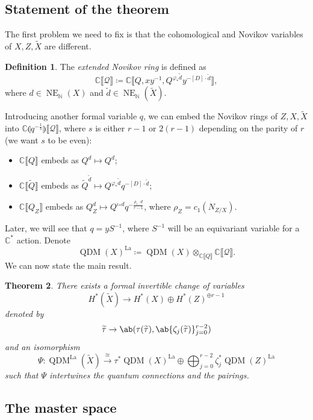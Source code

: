 \documentclass[leqno, openany]{memoir}
\newtheorem{thm}{Theorem}[section]
\theoremstyle{definition}
\newtheorem{defn}[thm]{Definition}
\theoremstyle{remark}
\theoremstyle{plain}
\theoremstyle{definition}
\theoremstyle{remark}
\newcommand{\N}{\mathbb{N}}
\newcommand{\C}{\mathbb{C}}
\newcommand{\mc}[1]{\mathcal{#1}}
\newcommand{\mr}[1]{\mathrm{#1}}
\newcommand{\on}[1]{\operatorname{#1}}
\newcommand{\wt}[1]{\widetilde{#1}}
\DeclareMathOperator{\QDM}{QDM}
\begin{document}
\subsection{Statement of the theorem}%
\label{sub:Compatibility of variables}

The first problem we need to fix is that the cohomological and Novikov variables of $X, Z, \wt{X}$ are different.
\begin{defn}
    The \textit{extended Novikov ring} is defined as 
    \[ \C\llbracket \mc{Q} \rrbracket \coloneqq \C \llbracket Q, xy^{-1}, Q^{\varphi_* \wt{d}} y^{-[D] \cdot \wt{d}} \rrbracket, \]
    where $d \in \on{NE}_{\N}(X)$ and $\wt{d} \in \on{NE}_{\N}(\wt{X})$.
\end{defn}

Introducing another formal variable $q$, we can embed the Novikov rings of $Z, X, \wt{X}$ into $\C\llparenthesis q^{-\frac{1}{s}} \rrparenthesis\llbracket \mc{Q} \rrbracket$, where $s$ is either $r-1$ or $2(r-1)$ depending on the parity of $r$ (we want $s$ to be even):
\begin{itemize}
    \item $\C\llbracket Q \rrbracket$ embeds as $Q^d \mapsto Q^d$;
    \item $\C \llbracket \wt{Q} \rrbracket$ embeds as $\wt{Q}^{\wt{d}} \mapsto Q^{\varphi_* \wt{d}} q^{-[D] \cdot \wt{d}}$;
    \item $\C \llbracket Q_Z \rrbracket$ embeds as $Q_Z^d \mapsto Q^{\iota_* d} q^{-\frac{\rho_z \cdot d}{r-1}}$, where $\rho_Z = c_1(N_{Z/X})$.
\end{itemize}
Later, we will see that $q = yS^{-1}$, where $S^{-1}$ will be an equivariant variable for a $\C^*$ action. Denote
\[ \QDM(X)^{\mr{La}} \coloneqq \QDM(X) \otimes_{\C\llbracket Q \rrbracket} \C \llbracket \mc{Q} \rrbracket. \]
We can now state the main result.

\begin{thm}\label{thm:blowup}
    There exists a formal invertible change of variables
    \[ H^*(\wt{X}) \to H^*(X) \oplus H^*(Z)^{\oplus r-1} \]
    denoted by
    \[ \wt{\tau} \to \ab(\tau(\wt{\tau}), \ab\{\zeta_j(\wt{\tau})\}_{j=0}^{r-2}) \]
    and an isomorphism
    \[ \Psi \colon \QDM^{\mr{La}}(\wt{X}) \xrightarrow{\cong} \tau^* \QDM(X)^{\mr{La}} \oplus \bigoplus_{j=0}^{r-2} \zeta_j^* \QDM(Z)^{\mr{La}} \]
    such that $\Psi$ intertwines the quantum connections and the pairings.
\end{thm}

\subsection{The master space}%
\label{sub:The master space}
\end{document}
